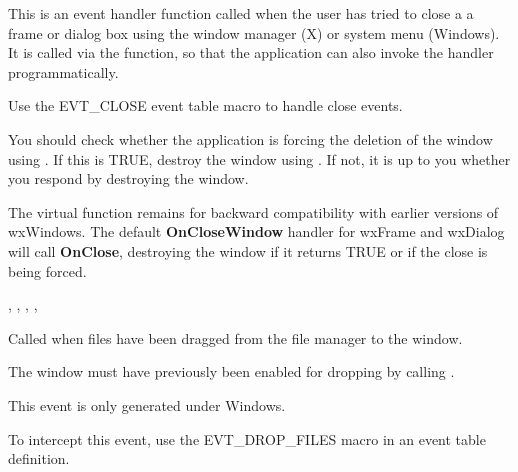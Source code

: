 
This is an event handler function called when the user has tried to close a a frame
or dialog box using the window manager (X) or system menu (Windows). It is
called via the  function, so
that the application can also invoke the handler programmatically.

Use the EVT\_CLOSE event table macro to handle close events.

You should check whether the application is forcing the deletion of the window
using . If this is TRUE,
destroy the window using .
If not, it is up to you whether you respond by destroying the window.


The  virtual function remains
for backward compatibility with earlier versions of wxWindows. The
default {\bf OnCloseWindow} handler for wxFrame and wxDialog will call {\bf OnClose},
destroying the window if it returns TRUE or if the close is being forced.


,\rtfsp
{},\rtfsp
{},\rtfsp
{},\rtfsp
{}

\label{wxwindowondropfiles}


Called when files have been dragged from the file manager to the window.




The window must have previously been enabled for dropping by calling
\rtfsp{}.

This event is only generated under Windows.

To intercept this event, use the EVT\_DROP\_FILES macro in an event table definition.

